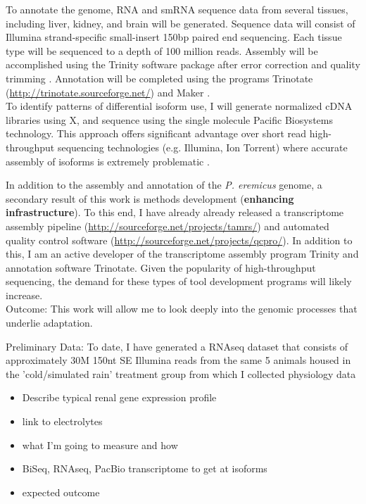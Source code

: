 \documentclass[11pt]{article}
\begin{document}
To annotate the genome, RNA and smRNA sequence data from several tissues, including liver, kidney, and brain will be generated. Sequence data will consist of Illumina strand-specific small-insert 150bp paired end sequencing. Each tissue type will be sequenced to a depth of 100 million reads.  Assembly will be accomplished using the Trinity software package \citep{Haas:2013jq,Grabherr:2011jb} after error correction \citep{MacManes:2013ec} and quality trimming \citep{MacManes:2013ex}. Annotation will be completed using the programs Trinotate (\url{http://trinotate.sourceforge.net/}) and Maker \citep{Cantarel:2008jo}. \\

To identify patterns of differential isoform use, I will generate normalized cDNA libraries using X, and sequence using the single molecule Pacific Biosystems technology. This approach offers significant advantage over short read high-throughput sequencing technologies (e.g. Illumina, Ion Torrent) where accurate assembly of isoforms is extremely problematic \citep{Pyrkosz:2013tm}.


In addition to the assembly and annotation of the \textit{P. eremicus} genome, a secondary result of this work is methods development (\textbf{enhancing infrastructure}). To this end, I have already already released a transcriptome assembly pipeline (\url{http://sourceforge.net/projects/tamrs/}) and automated quality control software (\url{http://sourceforge.net/projects/qcpro/}). In addition to this, I am an active developer of the transcriptome assembly program Trinity and annotation software Trinotate. Given the popularity of high-throughput sequencing, the demand for these types of tool development programs will likely increase. \\

Outcome: This work will allow me to look deeply into the genomic processes that underlie adaptation. 

Preliminary Data: To date, I have generated a RNAseq dataset that consists of approximately 30M 150nt SE Illumina reads from the same 5 animals housed in the 'cold/simulated rain' treatment group from which I collected physiology data


\begin{itemize}
\item Describe typical renal gene expression profile
\item link to electrolytes
\item what I'm going to measure and how
\item BiSeq, RNAseq, PacBio transcriptome to get at isoforms
\item expected outcome
\end{itemize}
\end{document}
